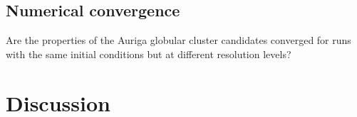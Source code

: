\documentclass[a4paper,fleqn,usenatbib]{mnras}
\begin{document}
\subsection{Numerical convergence} 
\label{sec:convergence}
Are the properties of the Auriga globular cluster candidates converged for runs with the same initial conditions but at different resolution levels? 







% 
% 
% 
% 






\section{Discussion}
\label{sec:discussion}
\end{document}
